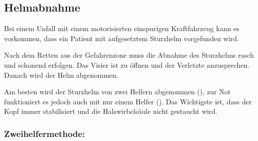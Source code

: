 % 
% 



\subsection{Helmabnahme}

Bei einem Unfall mit einem motorisierten einspurigen Kraftfahrzeug kann es
vorkommen, dass ein Patient mit aufgesetztem Sturzhelm vorgefunden wird. 

Nach dem Retten aus der Gefahrenzone muss die Abnahme des
Sturzhelms rasch und schonend erfolgen. Das Visier ist zu
öffnen und der Verletzte anzusprechen. Danach wird der Helm
abgenommen.


Am besten wird der Sturzhelm von zwei Helfern abgenommen
(), zur Not funktioniert es jedoch auch mit nur einem
Helfer (). Das Wichtigste ist, dass
der Kopf immer stabilisiert und die Halswirbelsäule nicht gestaucht wird.

\subsubsection{Zweihelfermethode:}

